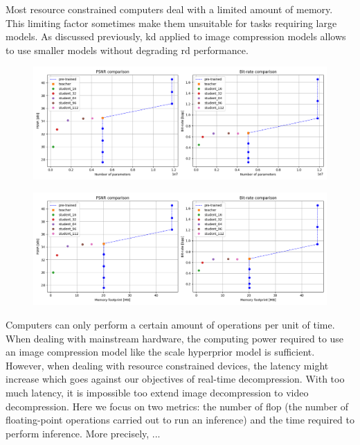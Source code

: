 Most resource constrained computers deal with a limited amount of memory. This limiting factor sometimes make them unsuitable for tasks requiring large models. As discussed previously, \acrshort{kd} applied to image compression models allows to use smaller models without degrading \acrshort{rd} performance. %

\begin{figure}
    \centering
    \includegraphics[width=15cm]{img/kd_lic_5.png}
    \caption[]{}
    \label{kd_lic_5}
\end{figure}

\begin{figure}
    \centering
    \includegraphics[width=15cm]{img/kd_lic_6.png}
    \caption[]{}
    \label{kd_lic_6}
\end{figure}

Computers can only perform a certain amount of operations per unit of time. When dealing with mainstream hardware, the computing power required to use an image compression model like the scale hyperprior model is sufficient. However, when dealing with resource constrained devices, the latency might increase which goes against our objectives of real-time decompression. With too much latency, it is impossible too extend image decompression to video decompression. Here we focus on two metrics: the number of \acrfull{flop} (the number of floating-point operations carried out to run an inference) and the time required to perform inference. More precisely, ... %

